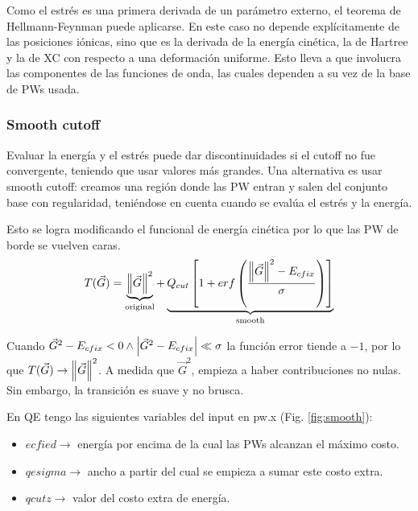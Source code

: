   Como el estrés es una primera derivada de un parámetro externo, el teorema de Hellmann-Feynman puede aplicarse. En este caso no depende explícitamente de las posiciones iónicas, sino que es la derivada de la energía cinética, la de Hartree y la de XC con respecto a una deformación uniforme. Esto lleva a que involucra las componentes de las funciones de onda, las cuales dependen a su vez de la base de PWs usada.

\subsubsection{Smooth cutoff}

  Evaluar la energía y el estrés puede dar discontinuidades si el cutoff no fue convergente, teniendo que usar valores más grandes. Una alternativa es usar smooth cutoff: creamos una región donde las PW entran y salen del conjunto base con regularidad, teniéndose en cuenta cuando se evalúa el estrés y la energía.

  Esto se logra modificando el funcional de energía cinética por lo que las PW de borde se vuelven caras.
    $$T (\vec{G}) = \underbrace{\norm{\vec{G}}^2}_{\text{original}} + \underbrace{Q_{cut} \left[ 1 + erf\left( \frac{\norm{\vec{G}}^2 - E_{cfix}}{\sigma} \right) \right]}_{\text{smooth}}$$

  Cuando $\vec{G}^2 - E_{cfix} < 0 \wedge \abs{\vec{G}^2 - E_{cfix}} \ll \sigma $ la función error tiende a $-1$, por lo que $T (\vec{G}) \rightarrow \norm{\vec{G}}^2$. A medida que $\vec{G}^2$, empieza a haber contribuciones no nulas. Sin embargo, la transición es suave y no brusca.

  En QE tengo las siguientes variables del input en pw.x (Fig. \ref{fig:smooth}):
    \begin{itemize}
      \item $ecfied \rightarrow$ energía por encima de la cual las PWs alcanzan el máximo costo.
      \item $qesigma \rightarrow$ ancho a partir del cual se empieza a sumar este costo extra.
      \item $qcutz \rightarrow$ valor del costo extra de energía.
    \end{itemize}

